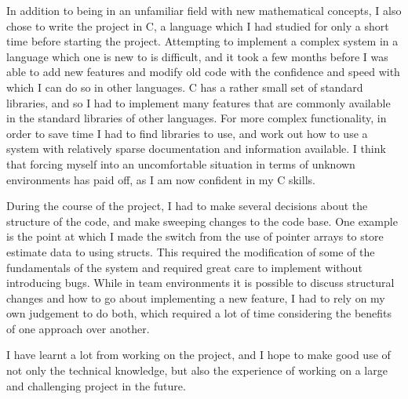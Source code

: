 \documentclass[a4paper,11pt,twoside]{article}
\begin{document}
   In addition to being in an unfamiliar field with new mathematical concepts, I
   also chose to write the project in C, a language which I had studied for only
   a short time before starting the project. Attempting to implement a complex
   system in a language which one is new to is difficult, and it took a few
   months before I was able to add new features and modify old code with the
   confidence and speed with which I can do so in other languages. C has a
   rather small set of standard libraries, and so I had to implement many
   features that are commonly available in the standard libraries of other
   languages. For more complex functionality, in order to save time I had to
   find libraries to use, and work out how to use a system with relatively
   sparse documentation and information available. I think that forcing myself
   into an uncomfortable situation in terms of unknown environments has paid
   off, as I am now confident in my C skills.

   During the course of the project, I had to make several decisions about the
   structure of the code, and make sweeping changes to the code base. One
   example is the point at which I made the switch from the use of pointer
   arrays to store estimate data to using structs. This required the
   modification of some of the fundamentals of the system and required great
   care to implement without introducing bugs. While in team environments it is
   possible to discuss structural changes and how to go about implementing a new
   feature, I had to rely on my own judgement to do both, which required a lot
   of time considering the benefits of one approach over another.

   I have learnt a lot from working on the project, and I hope to make good use
   of not only the technical knowledge, but also the experience of working on a
   large and challenging project in the future.
\end{document}
